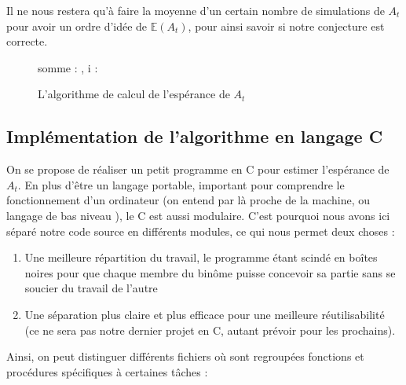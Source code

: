\documentclass[a4paper, titlepage]{livret} %
\begin{document}
				Il ne nous restera qu'à faire la moyenne d'un certain nombre de simulations de $A_{t}$ pour avoir un ordre d'idée de $\mathbb{E}(A_{t})$, pour ainsi savoir si notre conjecture est correcte.

				\begin{figure}[!ht]
					\begin{algorithme}
							{somme : \reel, i : \naturelNonNul}
							{
								{
								}
							}
					\end{algorithme}
					\caption{L'algorithme de calcul de l'espérance de $A_{t}$}
				\end{figure}

			\subsection{Implémentation de l'algorithme en langage C}
				On se propose de réaliser un petit programme en C pour estimer l'espérance de $A_{t}$.
				En plus d'être un langage portable, important pour comprendre le fonctionnement d'un ordinateur (on entend par là proche de la machine, ou \og langage de bas niveau \fg{}), le C est aussi modulaire.
				C'est pourquoi nous avons ici séparé notre code source en différents modules, ce qui nous permet deux choses :
				\begin{enumerate}
					\item Une meilleure répartition du travail, le programme étant scindé en \og boîtes noires \fg{} pour que chaque membre du binôme puisse concevoir sa partie sans se soucier du travail de l'autre
					\item Une séparation plus claire et plus efficace pour une meilleure réutilisabilité (ce ne sera pas notre dernier projet en C, autant prévoir pour les prochains).
				\end{enumerate}

				Ainsi, on peut distinguer différents fichiers où sont regroupées fonctions et procédures spécifiques à certaines tâches :
\end{document}
